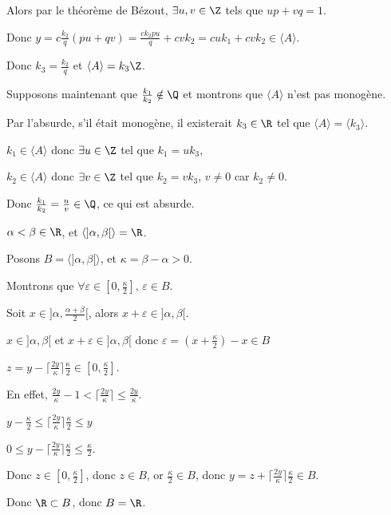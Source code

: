 \begin{exemple}
    Alors par le théorème de Bézout, $\exists u, v \in \Z$ tels que $up + vq = 1$.

    Donc $\displaystyle y = c \frac{k_2} q (pu + qv) = \frac{c k_2 p u}{q} + cv k_2 = c u k_1 + cv k_2 \in \langle A \rangle$.

    Donc $k_3 = \frac{k_2} q$ et $\langle A \rangle = k_3 \Z$.

    \svspace Supposons maintenant que $\frac{k_1}{k_2} \notin \Q$ et montrons 
    que $\langle A \rangle$ n'est pas monogène.

    Par l'absurde, s'il était monogène, il existerait $k_3 \in \R$ tel que
    $\langle A \rangle = \langle k_3 \rangle$. 

    $k_1 \in \langle A \rangle$ donc $\exists u \in \Z$ tel que $k_1 = u k_3$, 

    $k_2 \in \langle A \rangle$ donc $\exists v \in \Z$ tel que $k_2 = v k_3$, $v \neq 0$ car $k_2 \neq 0$.

    Donc $\frac{k_1}{k_2} = \frac u v \in \Q$, ce qui est absurde.


    $\alpha < \beta \in \R$, et $\langle ]\alpha, \beta[ \rangle = \R$.

    Posons $B = \langle ]\alpha, \beta[ \rangle$, et $\kappa = \beta - \alpha > 0$.

    Montrons que $\forall \varepsilon \in [0, \frac{\kappa} 2], \, \varepsilon \in B$.

    Soit $x \in ]\alpha, \frac{\alpha + \beta} 2[$, alors $x + \varepsilon \in ]\alpha, \beta[$.

    $x \in ]\alpha, \beta[$ et $x + \varepsilon \in ]\alpha, \beta[$ donc $\varepsilon = \left(x + \frac{\kappa}{2}\right) - x \in B$

    $z = y - \lceil \frac {2y} \kappa \rceil \frac \kappa 2 \in [0, \frac \kappa 2]$. 

    En effet, $\frac{2y} \kappa - 1 < \lceil \frac {2y} \kappa \rceil \leq \frac {2y} \kappa$.

    $y - \frac{\kappa }{2 } \leqslant \lceil \frac {2y} \kappa \rceil \frac \kappa 2 \leqslant y$

    $0 \leqslant y - \lceil \frac {2y} \kappa \rceil \frac \kappa 2 \leqslant \frac \kappa 2$.

    Donc $z \in [0, \frac \kappa 2]$, donc $z \in B$, or $\frac \kappa 2 \in B$, donc $y = z + \lceil \frac {2y} \kappa \rceil \frac \kappa 2 \in B$.

    Donc $\R \subset B$, donc $B = \R$.


\end{exemple}

